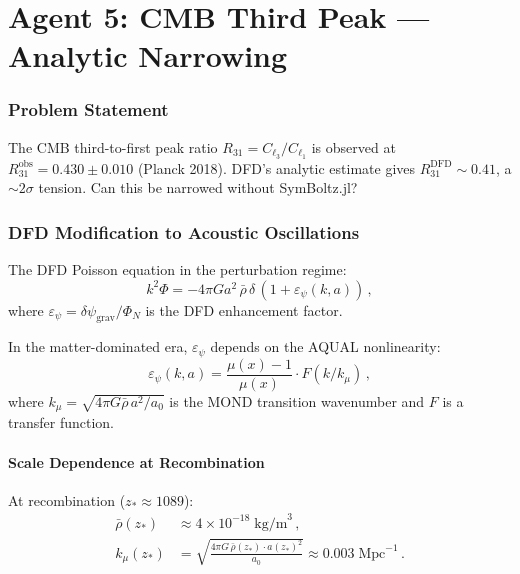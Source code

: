 \documentclass[11pt,a4paper]{article}
\begin{document}
\part{Agent 5: CMB Third Peak --- Analytic Narrowing}
\label{part:cmb}

\section{Problem Statement}

The CMB third-to-first peak ratio $R_{31} = C_{\ell_3}/C_{\ell_1}$ is observed at $R_{31}^{\mathrm{obs}} = 0.430 \pm 0.010$ (Planck 2018). DFD's analytic estimate gives $R_{31}^{\mathrm{DFD}} \sim 0.41$, a $\sim 2\sigma$ tension. Can this be narrowed without SymBoltz.jl?

\section{DFD Modification to Acoustic Oscillations}

The DFD Poisson equation in the perturbation regime:
\begin{equation}
k^2\Phi = -4\pi G a^2\,\bar{\rho}\,\delta\,(1 + \varepsilon_\psi(k, a))\,,
\end{equation}
where $\varepsilon_\psi = \delta\psi_{\mathrm{grav}}/\Phi_N$ is the DFD enhancement factor.

In the matter-dominated era, $\varepsilon_\psi$ depends on the AQUAL nonlinearity:
\begin{equation}
\varepsilon_\psi(k, a) = \frac{\mu(x) - 1}{\mu(x)} \cdot F(k/k_\mu)\,,
\end{equation}
where $k_\mu = \sqrt{4\pi G\bar{\rho}\,a^2 / a_0}$ is the MOND transition wavenumber and $F$ is a transfer function.

\subsection{Scale Dependence at Recombination}

At recombination ($z_* \approx 1089$):
\begin{align}
\bar{\rho}(z_*) &\approx 4 \times 10^{-18}\;\mathrm{kg/m}^3\,, \\
k_\mu(z_*) &= \sqrt{\frac{4\pi G\,\bar{\rho}(z_*) \cdot a(z_*)^2}{a_0}} \approx 0.003\;\mathrm{Mpc}^{-1}\,.
\end{align}
\end{document}
